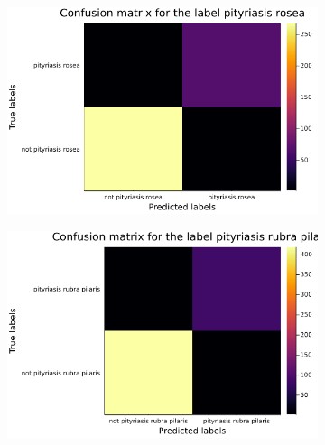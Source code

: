 \documentclass[12pt,a4paper]{article}
\begin{document}
\begin{figure}[H]\ContinuedFloat
    \centering
    \begin{subfigure}{0.6\textwidth}
        \includegraphics[scale=.4]{../trab5 (MLP)/figs/dermatology-pityriasis rosea-confusion-matrix.png}
        \label{subfig:itemc}
    \end{subfigure}
\end{figure}    
\begin{figure}[H]\ContinuedFloat
    \centering
    \begin{subfigure}{0.6\textwidth}
        \includegraphics[scale=.4]{../trab5 (MLP)/figs/dermatology-pityriasis rubra pilaris-confusion-matrix.png}
        \label{subfig:itemd}
    \end{subfigure}
\end{figure}    
\end{document}
